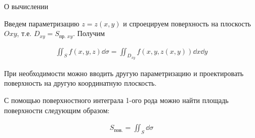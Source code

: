 \begin{remark}
  О вычислении

  Введем параметризацию \(z = z(x, y)\) и спроецируем поверхность на плоскость
  \(Oxy\), т.е. \(D_{xy} = S_{\text{пр. }xy}\). Получим

  \begin{align*}
    \iint_{S} f(x, y, z) \dd \sigma
    = \iint_{D_{xy}} f(x, y, z(x, y)) \dd x \dd y
  \end{align*}

  При необходимости можно вводить другую параметризацию и проектировать
  поверхность на другую координатную плоскость.
\end{remark}

\begin{remark}
  С помощью поверхностного интеграла 1-ого рода можно найти площадь поверхности
  следующим образом:

  \begin{align*}
    S_{\text{пов.}} = \iint_{S} \dd \sigma
  \end{align*}
\end{remark}